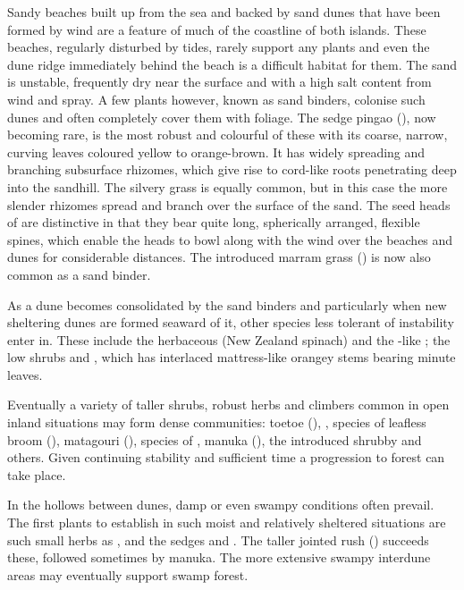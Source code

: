 Sandy beaches built up from the sea and backed by sand dunes that have been formed by wind are a feature of much of the coastline of both islands.
These beaches, regularly disturbed by tides, rarely support any plants and even the dune ridge immediately behind the beach is a difficult habitat for them.
The sand is unstable, frequently dry near the surface and with a high salt content from wind and spray.
A few plants however, known as sand binders, colonise such dunes and often completely cover them with foliage.
The sedge pingao (), now becoming rare, is the most robust and colourful of these with its coarse, narrow, curving leaves coloured yellow to orange-brown.
It has widely spreading and branching subsurface rhizomes, which give rise to cord-like roots penetrating deep into the sandhill.
The silvery grass  is equally common, but in this case the more slender rhizomes spread and branch over the surface of the sand.
The seed heads of  are distinctive in that they bear quite long, spherically arranged, flexible spines, which enable the heads to bowl along with the wind over the beaches and dunes for considerable distances.
The introduced marram grass () is now also common as a sand binder.

As a dune becomes consolidated by the sand binders and particularly when new sheltering dunes are formed seaward of it, other species less tolerant of instability enter in.
These include the herbaceous  (New Zealand spinach) and the -like ; the low shrubs  and , which has interlaced mattress-like orangey stems bearing minute leaves.

Eventually a variety of taller shrubs, robust herbs and climbers common in open inland situations may form dense communities: toetoe (),  , species of leafless broom (), matagouri (), species of , manuka (), the introduced shrubby  and others.
Given continuing stability and sufficient time a progression to forest can take place.

In the hollows between dunes, damp or even swampy conditions often prevail.
The first plants to establish in such moist and relatively sheltered situations are such small herbs as ,  and the sedges  and .
The taller jointed rush () succeeds these, followed sometimes by manuka.
The more extensive swampy interdune areas may eventually support swamp forest.


